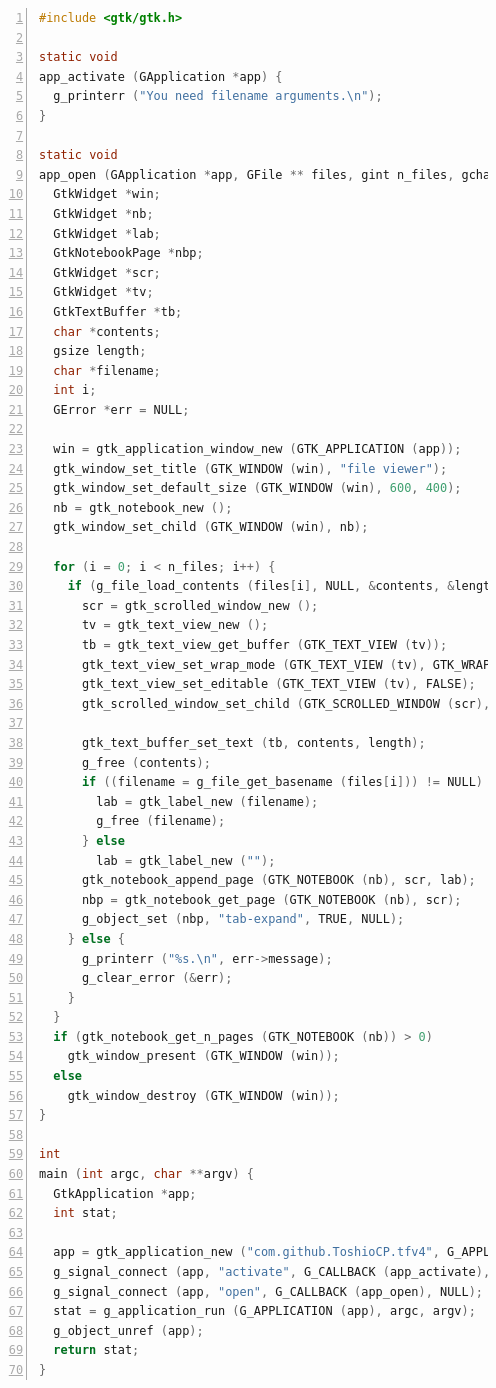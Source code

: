\begin{lstlisting}[language=C, numbers=left]
#include <gtk/gtk.h>

static void
app_activate (GApplication *app) {
  g_printerr ("You need filename arguments.\n");
}

static void
app_open (GApplication *app, GFile ** files, gint n_files, gchar *hint) {
  GtkWidget *win;
  GtkWidget *nb;
  GtkWidget *lab;
  GtkNotebookPage *nbp;
  GtkWidget *scr;
  GtkWidget *tv;
  GtkTextBuffer *tb;
  char *contents;
  gsize length;
  char *filename;
  int i;
  GError *err = NULL;

  win = gtk_application_window_new (GTK_APPLICATION (app));
  gtk_window_set_title (GTK_WINDOW (win), "file viewer");
  gtk_window_set_default_size (GTK_WINDOW (win), 600, 400);
  nb = gtk_notebook_new ();
  gtk_window_set_child (GTK_WINDOW (win), nb);

  for (i = 0; i < n_files; i++) {
    if (g_file_load_contents (files[i], NULL, &contents, &length, NULL, &err)) {
      scr = gtk_scrolled_window_new ();
      tv = gtk_text_view_new ();
      tb = gtk_text_view_get_buffer (GTK_TEXT_VIEW (tv));
      gtk_text_view_set_wrap_mode (GTK_TEXT_VIEW (tv), GTK_WRAP_WORD_CHAR);
      gtk_text_view_set_editable (GTK_TEXT_VIEW (tv), FALSE);
      gtk_scrolled_window_set_child (GTK_SCROLLED_WINDOW (scr), tv);

      gtk_text_buffer_set_text (tb, contents, length);
      g_free (contents);
      if ((filename = g_file_get_basename (files[i])) != NULL) {
        lab = gtk_label_new (filename);
        g_free (filename);
      } else
        lab = gtk_label_new ("");
      gtk_notebook_append_page (GTK_NOTEBOOK (nb), scr, lab);
      nbp = gtk_notebook_get_page (GTK_NOTEBOOK (nb), scr);
      g_object_set (nbp, "tab-expand", TRUE, NULL);
    } else {
      g_printerr ("%s.\n", err->message);
      g_clear_error (&err);
    }
  }
  if (gtk_notebook_get_n_pages (GTK_NOTEBOOK (nb)) > 0)
    gtk_window_present (GTK_WINDOW (win));
  else
    gtk_window_destroy (GTK_WINDOW (win));
}

int
main (int argc, char **argv) {
  GtkApplication *app;
  int stat;

  app = gtk_application_new ("com.github.ToshioCP.tfv4", G_APPLICATION_HANDLES_OPEN);
  g_signal_connect (app, "activate", G_CALLBACK (app_activate), NULL);
  g_signal_connect (app, "open", G_CALLBACK (app_open), NULL);
  stat = g_application_run (G_APPLICATION (app), argc, argv);
  g_object_unref (app);
  return stat;
}
\end{lstlisting}

